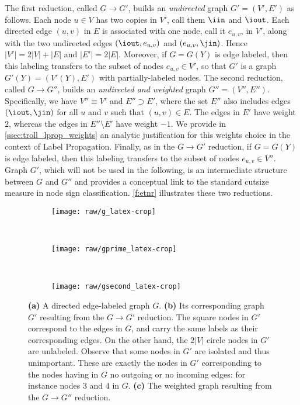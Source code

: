 The first reduction, called $G \rightarrow G'$, builds an \emph{undirected} graph $G' = (V',E')$ as
follows. Each node $u \in V$ has two copies in $V'$, call them $\iin$ and $\iout$. Each directed
edge $(u,v)$ in $E$ is associated with one node, call it $e_{u,v}$, in $V'$, along with the two
undirected edges $(\iout,e_{u,v})$ and $(e_{u,v},\jin)$. Hence $|V'| = 2|V|+|E|$ and $|E'| = 2|E|$.
Moreover, if $G = G(Y)$ is edge labeled, then this labeling transfers to the subset of nodes
$e_{u,v} \in V'$, so that $G'$ is a graph $G'(Y) = (V'(Y),E')$ with partially-labeled nodes. The
second reduction, called $G \rightarrow G''$, builds an \emph{undirected and weighted} graph $G'' =
(V'',E'')$. Specifically, we have $V'' \equiv V'$ and $E'' \supset E'$, where the set $E''$ also
includes edges $(\iout,\jin)$ for all $u$ and $v$ such that $(u,v) \in E$. The edges in $E'$ have
weight $2$, whereas the edges in $E''\setminus E'$ have weight $-1$. We provide in
\autoref{ssec:troll_lprop_weights} an analytic justification for this weights choice in the context
of Label Propagation. Finally, as in the $G \rightarrow G'$ reduction, if $G = G(Y)$ is edge
labeled, then this labeling transfers to the subset of nodes $e_{u,v} \in V''$. Graph $G'$, which
will not be used in the following, is an intermediate structure between $G$ and $G''$ and provides a
conceptual link to the standard cutsize measure in node sign classification. \autoref{f:etnr}
illustrates these two reductions. 

\begin{figure*}[t]
  \centering
  \begin{subfigure}[b]{0.28\textwidth}
    \centering \texttt{[image: raw/g\_latex-crop]} \caption{}
  \end{subfigure}~
  \begin{subfigure}[b]{0.30\textwidth}
    \centering \texttt{[image: raw/gprime\_latex-crop]}
    \caption{\label{fig:troll_reduction_gprime}}
  \end{subfigure}~
  \begin{subfigure}[b]{0.36\textwidth}
    \centering \texttt{[image: raw/gsecond\_latex-crop]}
    \caption{\label{fig:troll_reduction_gsecond}}
  \end{subfigure}
  \caption{\label{f:etnr}
    \textbf{(a)} A directed edge-labeled graph $G$. \textbf{(b)} Its corresponding graph $G'$
    resulting from the $G\rightarrow G'$ reduction. The square nodes in $G'$ correspond to the
    edges in $G$, and carry the same labels as their corresponding edges. On the other hand, the
    $2|V|$ circle nodes in $G'$ are unlabeled. Observe that some nodes in $G'$ are isolated and
    thus unimportant. These are exactly the nodes in $G'$ corresponding to the nodes having in $G$
    no outgoing or no incoming edges: for instance nodes $3$ and $4$ in $G$. \textbf{(c)} The
    weighted graph resulting from the $G\rightarrow G''$ reduction.
  }
\end{figure*}

